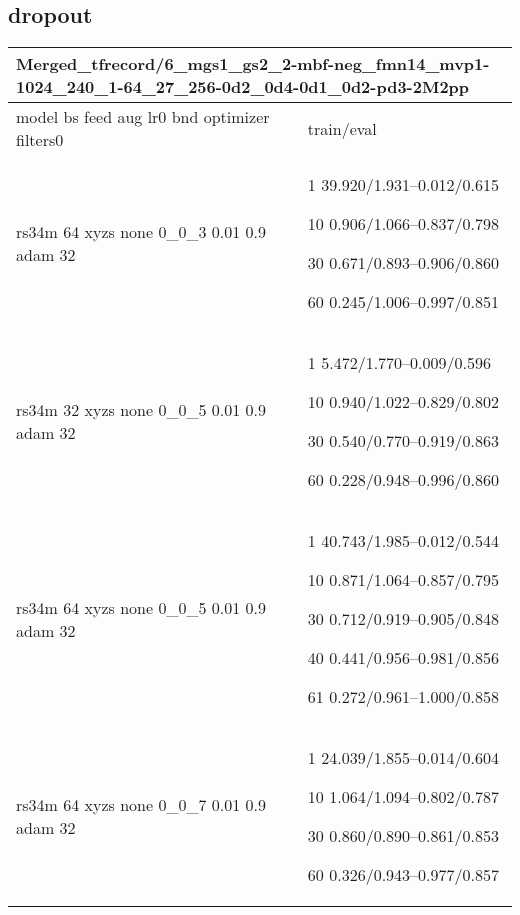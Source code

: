\documentclass[,table,dvipsnames]{article}
\begin{document}
\subsection{dropout}
\noindent\begin{tabular}{|p{9cm}|p{6cm}| }	
	\hline
	\multicolumn{2}{|p{15cm}|}{Merged\_tfrecord/6\_mgs1\_gs2\_2-mbf-neg\_fmn14\_mvp1-1024\_240\_1-64\_27\_256-0d2\_0d4-0d1\_0d2-pd3-2M2pp}\\
	\hline
	model bs feed aug lr0 bnd optimizer filters0 & train/eval \\
	
	\rowcolor{green!20}
	rs34m 64 xyzs none 0\_0\_3 0.01 0.9 adam 32 & 1 39.920/1.931--0.012/0.615\par 10 0.906/1.066--0.837/0.798\par \par 30 0.671/0.893--0.906/0.860\par 60 0.245/1.006--0.997/0.851 \\
	
	\rowcolor{yellow!20}
	rs34m 32 xyzs none 0\_0\_5 0.01 0.9 adam 32& 1 5.472/1.770--0.009/0.596\par 10 0.940/1.022--0.829/0.802\par 30 0.540/0.770--0.919/0.863\par 60 0.228/0.948--0.996/0.860\\
	
	\rowcolor{blue!20}
	rs34m 64 xyzs none 0\_0\_5 0.01 0.9 adam 32& 1 40.743/1.985--0.012/0.544\par 10 0.871/1.064--0.857/0.795\par 30 0.712/0.919--0.905/0.848\par 40 0.441/0.956--0.981/0.856\par 61 0.272/0.961--1.000/0.858\\
	
	\rowcolor{orange!20}
	rs34m 64 xyzs none  0\_0\_7 0.01 0.9 adam 32& 1 24.039/1.855--0.014/0.604\par 10 1.064/1.094--0.802/0.787\par 30 0.860/0.890--0.861/0.853\par 60 0.326/0.943--0.977/0.857\\
	
	\hline
\end{tabular}
\end{document}

